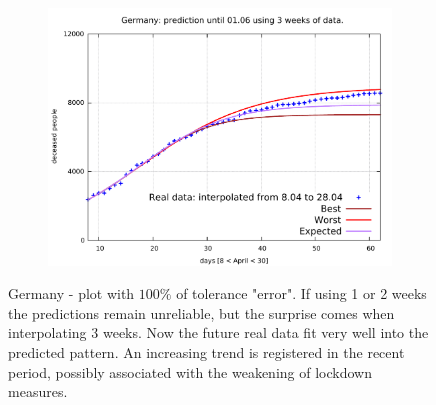 \documentclass[8pt]{article}
\begin{document}
\begin{figure}[h!]
\begin{subfigure}[b]{0.45\linewidth}
  \includegraphics[width=\linewidth]{../err100p_simulations/de/8-28/8-28.pdf}
  \end{subfigure}
	\caption{Germany - plot with $100\%$ of tolerance "error". If using
	1 or 2 weeks the predictions remain unreliable, but the surprise comes
	when interpolating 3 weeks.
	Now the future real data fit very well into the predicted pattern.
	An increasing trend is registered in the recent period,
	possibly associated with the weakening of lockdown measures.}
\end{figure}
\end{document}
